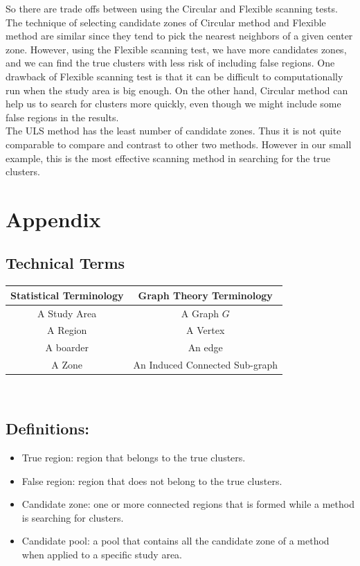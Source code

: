 \documentclass[12pt]{article}
\begin{document}
So there are trade offs between using the Circular and Flexible scanning tests. The technique of selecting candidate zones of Circular method and Flexible method are similar since they tend to pick the nearest neighbors of a given center zone. However, using the Flexible scanning test, we have more candidates zones, and we can find the true clusters with less risk of including false regions. One drawback of Flexible scanning test is that it can be difficult to computationally run when the study area is big enough. On the other hand, Circular method can help us to search for clusters more quickly, even though we might include some false regions in the results. \\
   
The ULS method has the least number of candidate zones. Thus it is not quite comparable to compare and contrast to other two methods. However in our small example, this is the most effective scanning method in searching for the true clusters. \\



\section{Appendix}
\subsection{Technical Terms}
\begin{tabular}{|c|c|}
\hline
\textbf{Statistical Terminology }& \textbf{Graph Theory Terminology} \\
\hline
A Study Area & A Graph $G$ \\
A Region & A Vertex \\
A boarder & An edge \\
A Zone & An Induced Connected Sub-graph\\

\hline

\end{tabular} \\

 	
\subsection{Definitions:} 
\begin{itemize}
\item True region:  region that belongs to the true clusters. \\ 
\item False region:  region that does not belong to the true clusters. \\ 
\item Candidate zone:  one or more connected regions that is formed while a method is searching for clusters.\\ 
\item Candidate pool:  a pool that contains all the candidate zone of a method when applied to a specific study area. \\
\end{itemize}
\end{document}
